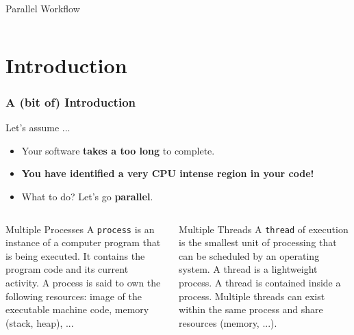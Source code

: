 \documentclass[9pt,pdftex]{beamer}
\begin{document}
\begin{frame}
\begin{columns}[t]
\begin{column}{.45\textwidth}
\begin{block}{Parallel  Workflow}
      \end{block}
    \end{column}
  \end{columns}
  \vfill
\end{frame}

\maketitle

\section[Intro]{Introduction}
\begin{frame}
\frametitle{A (bit of) Introduction}
\begin{block}{Let's assume ...}
  \begin{center}
    \begin{itemize}
    \item Your software \textbf{takes a too long} to complete.
    \item \textbf{You have identified a very CPU intense region in your code!} \\
    \item What to do? Let's go \textbf{parallel}.
    \end{itemize}
  \end{center}
\end{block}
\vfill
\begin{columns}[t]
  \begin{column}{.45\textwidth}
    \begin{block}{Multiple Processes}
      A \texttt{process}\cite{Wikipedia:Processes} is an instance of a computer program that is being executed. 
      It contains the program code and its current activity. A process is said to own the following resources: image of the executable machine code, memory (stack, heap), ...
    \end{block}
  \end{column}
\hfill
\pause
  \begin{column}{.45\textwidth}
    \begin{block}{Multiple Threads}
      A \texttt{thread}\cite{Wikipedia:Threads} of execution is the smallest unit of processing that can be scheduled by an operating system.
      A thread is a lightweight process. A thread is contained inside a process. 
      Multiple threads can exist within the same process and share resources (memory, ...).
    \end{block}
  \end{column}
\end{columns}
\vfill
\end{frame}
\end{document}
